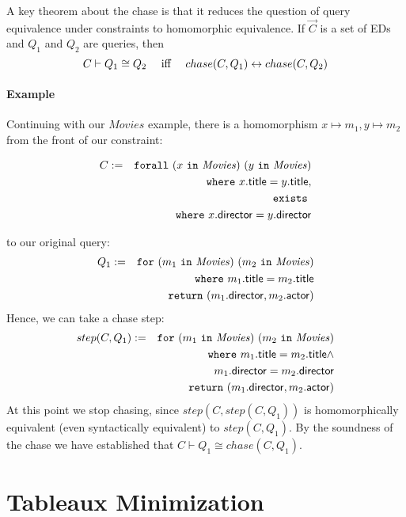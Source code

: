 \documentclass[preprint]{sigplanconf}
\newcommand{\FOR}{{\tt for} \ }
\newcommand{\FORALL}{{\tt forall} \ }
\newcommand{\EXISTS}{{\tt exists} \ }
\newcommand{\WHERE}{{\tt where} \ }
\newcommand{\IN}{ \ {\tt in} \ }
\newcommand{\RETURN}{{\tt return} \ }
\newcommand{\relation}[1]{\ensuremath{\mathit{#1}}\xspace}
\begin{document}
A key theorem about the chase is that it reduces the question of query equivalence under constraints to homomorphic equivalence.
If $\vec{C}$ is a set of EDs and $Q_1$ and $Q_2$ are queries, then
\[
C \vdash Q_1 \cong Q_2 \ \ \ \  \textnormal{iff} \ \ \ \ chase(C,Q_1) \leftrightarrow chase(C, Q_2)
\]
\paragraph{Example} Continuing with our \relation{Movies} example, there is a homomorphism $x \mapsto 
m_1, y \mapsto m_2$ from the front of our constraint: 
\begin{normalsize}
\begin{eqnarray*}
C& := & \FORALL (x \IN \relation{Movies}) \ (y \IN \relation{Movies}) \\
& & \WHERE x.{\sf title} = y.{\sf title}, \\ 
& & \EXISTS \\
& & \WHERE x.{\sf director} = y.{\sf director}
\end{eqnarray*}
\end{normalsize}
to our original query:
\begin{eqnarray*}
Q_1 & := & \FOR (m_1 \IN \relation{Movies}) \ (m_2 \IN \relation{Movies}) \\
 & & \WHERE m_1.{\sf title} = m_2.{\sf title} \\
 & & \RETURN (m_1.{\sf director}, m_2.{\sf actor})
\end{eqnarray*}
Hence, we can take a chase step:
\begin{eqnarray*}
step(C, Q_1) := & & \FOR (m_1 \IN \relation{Movies}) \ (m_2 \IN \relation{Movies}) \\
 & & \WHERE m_1.{\sf title} = m_2.{\sf title} \wedge \\
 & & \ \ \ \ \ \ \ \ \ \ \ \  m_1.{\sf director} = m_2.{\sf 
director} \\
 & & \RETURN (m_1.{\sf director}, m_2.{\sf actor})
\end{eqnarray*}
At this point we stop chasing, since $step(C, step(C, Q_1))$ is homomorphically equivalent (even syntactically equivalent) to $step(C, Q_1)$.
By the soundness of the chase we have established that $C \vdash Q_1 \cong chase(C, Q_1)$.

\section{Tableaux Minimization}
\label{sec:minimize}
\end{document}
